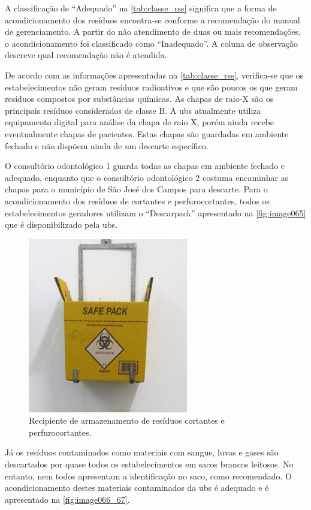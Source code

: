 	A classificação de “Adequado” na \autoref{tab:classe_rss} significa que a forma de acondicionamento dos resíduos encontra-se conforme a recomendação do manual de gerenciamento. A partir do não atendimento de duas ou mais recomendações, o acondicionamento foi classificado como “Inadequado”. A coluna de observação descreve qual recomendação não é atendida.
	
	
	
	De acordo com as informações apresentadas na \autoref{tab:classe_rss}, verifica-se que os estabelecimentos não geram resíduos radioativos e que são poucos os que geram resíduos compostos por substâncias químicas. As chapas de raio-X são os principais resíduos considerados de classe B. A \gls{ubs} atualmente utiliza equipamento digital para análise da chapa de raio X, porém ainda recebe eventualmente chapas de pacientes. Estas chapas são guardadas em ambiente fechado e não dispõem ainda de um descarte específico.
	
	O consultório odontológico 1 guarda todas as chapas em ambiente fechado e adequado, enquanto que o consultório odontológico 2 costuma encaminhar as chapas para o município de São José dos Campos para descarte.
	Para o acondicionamento dos resíduos de cortantes e perfurocortantes, todos os estabelecimentos geradores utilizam o “Descarpack” apresentado na \autoref{fig:image065} que é disponibilizado pela \gls{ubs}.
	
	\begin{figure}
		\centering
		\includegraphics[width=0.45\linewidth]{produtos/prodtres/image065}
		\caption{Recipiente de armazenamento de resíduos cortantes e perfurocortantes.}
		\label{fig:image065}
	\end{figure}
	
	
	Já os resíduos contaminados como materiais com sangue, luvas e gases são descartados por quase todos os estabelecimentos em sacos brancos leitosos. No entanto, nem todos apresentam a identificação no saco, como recomendado. O acondicionamento destes materiais contaminados da \gls{ubs} é adequado e é apresentado na \autoref{fig:image066_67}.

